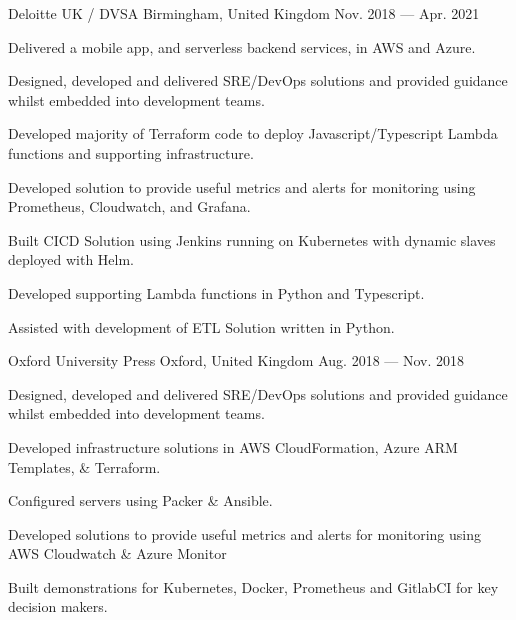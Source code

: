 \begin{cventries}
    {Deloitte UK / DVSA}
    {Birmingham, United Kingdom}
    {Nov. 2018 — Apr. 2021}
    {
        \begin{cvitems}
        \item{Delivered a mobile app, and serverless backend services, in AWS and Azure.}
        \item{Designed, developed and delivered SRE/DevOps solutions and provided guidance whilst embedded into development teams.}
        \item{Developed majority of Terraform code to deploy Javascript/Typescript Lambda functions and supporting infrastructure.}
        \item{Developed solution to provide useful metrics and alerts for monitoring using Prometheus, Cloudwatch, and Grafana.}
        \item{Built CICD Solution using Jenkins running on Kubernetes with dynamic slaves deployed with Helm.}
        \item{Developed supporting Lambda functions in Python and Typescript.}
        \item{Assisted with development of ETL Solution written in Python.}
        \end{cvitems}
    }

    {Oxford University Press}
    {Oxford, United Kingdom}
    {Aug. 2018 — Nov. 2018}
    {
        \begin{cvitems}
        \item{Designed, developed and delivered SRE/DevOps solutions and provided guidance whilst embedded into development teams.}
        \item{Developed infrastructure solutions in AWS CloudFormation, Azure ARM Templates, \& Terraform.}
        \item{Configured servers using Packer \& Ansible.}
        \item{Developed solutions to provide useful metrics and alerts for monitoring using AWS Cloudwatch \& Azure Monitor}
        \item{Built demonstrations for Kubernetes, Docker, Prometheus and GitlabCI for key decision makers.}
        \end{cvitems}
    }


\end{cventries}
